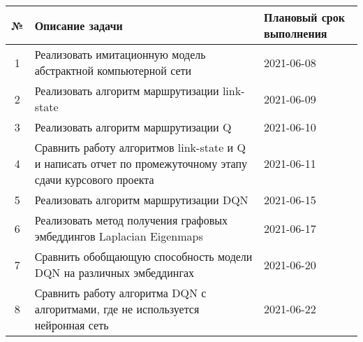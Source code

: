\documentclass[a4paper]{article}
\begin{document}
\begin{table}[H]
    \centering
    \begin{tabular}{cp{9cm}p{2cm}}
        № &
        Описание задачи &
        Плановый срок выполнения \\
        \hline
        1 &
        Реализовать имитационную модель абстрактной компьютерной сети &
        2021-06-08 \\
        2 &
        Реализовать алгоритм маршрутизации link-state &
        2021-06-09 \\
        3 &
        Реализовать алгоритм маршрутизации Q &
        2021-06-10 \\
        4 &
        Сравнить работу алгоритмов link-state и Q и написать отчет по
        промежуточному этапу сдачи курсового проекта &
        2021-06-11 \\
        5 &
        Реализовать алгоритм маршрутизации DQN &
        2021-06-15 \\
        6 &
        Реализовать метод получения графовых эмбеддингов Laplacian Eigenmaps &
        2021-06-17 \\
        7 &
        Сравнить обобщающую способность модели DQN на различных
        эмбеддингах &
        2021-06-20 \\
        8 &
        Сравнить работу алгоритма DQN с алгоритмами, где не используется
        нейронная сеть &
        2021-06-22 \\
        \hline
    \end{tabular}
\end{table}
\end{document}
